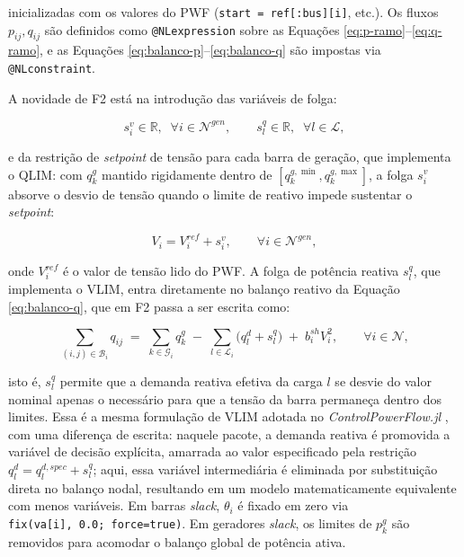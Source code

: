 \noindent inicializadas com os valores do PWF (\texttt{start =\allowbreak\ ref[:bus][i]\allowbreak ["vm"]}, etc.). Os fluxos $p_{ij}, q_{ij}$ são definidos como \texttt{@NLexpression} sobre as Equações \eqref{eq:p-ramo}--\eqref{eq:q-ramo}, e as Equações \eqref{eq:balanco-p}--\eqref{eq:balanco-q} são impostas via \texttt{@NLconstraint}.

A novidade de F2 está na introdução das variáveis de folga:

\begin{equation}
\label{eq:slacks-vlim-qlim}
s^v_i \in \mathbb{R}, \;\; \forall i \in \mathcal{N}^{gen}, \qquad s^q_l \in \mathbb{R}, \;\; \forall l \in \mathcal{L},
\end{equation}

\noindent e da restrição de \textit{setpoint} de tensão para cada barra de geração, que implementa o QLIM: com $q^g_k$ mantido rigidamente dentro de $[q^{g,\min}_k, q^{g,\max}_k]$, a folga $s^v_i$ absorve o desvio de tensão quando o limite de reativo impede sustentar o \textit{setpoint}:

\begin{equation}
\label{eq:setpoint-vlim}
V_i = V^{ref}_i + s^v_i, \qquad \forall i \in \mathcal{N}^{gen},
\end{equation}

\noindent onde $V^{ref}_i$ é o valor de tensão lido do PWF. A folga de potência reativa $s^q_l$, que implementa o VLIM, entra diretamente no balanço reativo da Equação \eqref{eq:balanco-q}, que em F2 passa a ser escrita como:

\begin{equation}
\label{eq:balanco-q-folga}
\sum_{(i,j) \in \mathcal{B}_i} q_{ij} \;=\; \sum_{k \in \mathcal{G}_i} q^g_k \;-\; \sum_{l \in \mathcal{L}_i} \big( q^d_l + s^q_l \big) \;+\; b^{sh}_i V_i^2, \qquad \forall i \in \mathcal{N},
\end{equation}

\noindent isto é, $s^q_l$ permite que a demanda reativa efetiva da carga $l$ se desvie do valor nominal apenas o necessário para que a tensão da barra permaneça dentro dos limites. Essa é a mesma formulação de VLIM adotada no \textit{ControlPowerFlow.jl} \cite{chavarry2024}, com uma diferença de escrita: naquele pacote, a demanda reativa é promovida a variável de decisão explícita, amarrada ao valor especificado pela restrição $q^d_l = q^{d,spec}_l + s^q_l$; aqui, essa variável intermediária é eliminada por substituição direta no balanço nodal, resultando em um modelo matematicamente equivalente com menos variáveis. Em barras \textit{slack}, $\theta_i$ é fixado em zero via \texttt{fix(va[i],\allowbreak\ 0.0;\allowbreak\ force=true)}. Em geradores \textit{slack}, os limites de $p^g_k$ são removidos para acomodar o balanço global de potência ativa.


